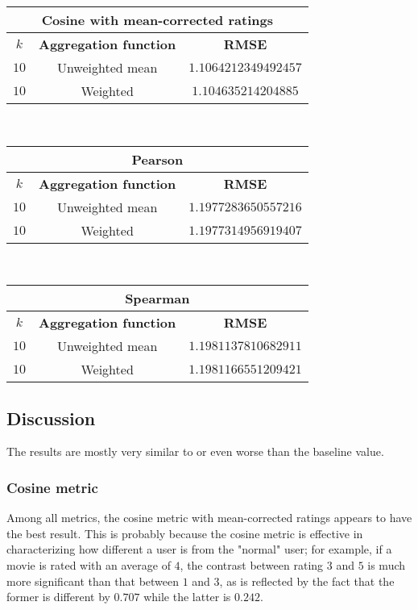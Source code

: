\documentclass[final]{cvpr}
\begin{document}
\vspace{1em}

\begin{tabular}{| c | c | c |}
	\hline
	\multicolumn{3}{|c|}{\textbf{Cosine with mean-corrected ratings}}\\
	\hline
	$k$ & \textbf{Aggregation function} & \textbf{RMSE}\\
	\hline
	$10$ & Unweighted mean & $1.1064212349492457$\\
	\hline
	$10$ & Weighted & $1.104635214204885$\\
	\hline
\end{tabular}\\

\vspace{1em}

\begin{tabular}{| c | c | c |}
	\hline
	\multicolumn{3}{|c|}{\textbf{Pearson}}\\
	\hline
	$k$ & \textbf{Aggregation function} & \textbf{RMSE}\\
	\hline
	$10$ & Unweighted mean & $1.1977283650557216$\\
	\hline
	$10$ & Weighted & $1.1977314956919407$\\
	\hline
\end{tabular}\\

\vspace{1em}

\begin{tabular}{| c | c | c |}
	\hline
	\multicolumn{3}{|c|}{\textbf{Spearman}}\\
	\hline
	$k$ & \textbf{Aggregation function} & \textbf{RMSE}\\
	\hline
	$10$ & Unweighted mean & $1.1981137810682911$\\
	\hline
	$10$ & Weighted & $1.1981166551209421$\\
	\hline
\end{tabular}

\vspace{1em}

\subsection{Discussion}
The results are mostly very similar to or even worse than the baseline value.

\subsubsection{Cosine metric}
Among all metrics, the cosine metric with mean-corrected ratings
appears to have the best result.
This is probably because the cosine metric is effective in characterizing
how different a user is from the "normal" user;
for example, if a movie is rated with an average of $4$,
the contrast between rating $3$ and $5$ is much more significant than
that between $1$ and $3$,
as is reflected by the fact that the former is different by $0.707$
while the latter is $0.242$.
\end{document}
